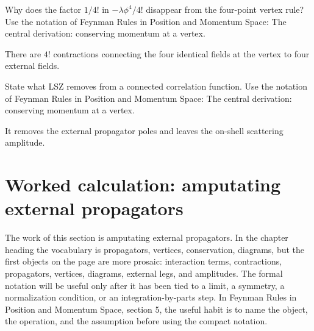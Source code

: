 \begin{exercise}
Why does the factor \(1/4!\) in \(-\lambda\phi^4/4!\) disappear from the four-point vertex rule?  Use the notation of Feynman Rules in Position and Momentum Space: The central derivation: conserving momentum at a vertex.
\begin{answer}
There are \(4!\) contractions connecting the four identical fields at the vertex to four external fields.
\end{answer}
\end{exercise}

\begin{exercise}
State what LSZ removes from a connected correlation function.  Use the notation of Feynman Rules in Position and Momentum Space: The central derivation: conserving momentum at a vertex.
\begin{answer}
It removes the external propagator poles and leaves the on-shell scattering amplitude.
\end{answer}
\end{exercise}



\section{Worked calculation: amputating external propagators}













The work of this section is amputating external propagators.  In the chapter heading the vocabulary is propagators, vertices, conservation, diagrams, but the first objects on the page are more prosaic: interaction terms, contractions, propagators, vertices, diagrams, external legs, and amplitudes.  The formal notation will be useful only after it has been tied to a limit, a symmetry, a normalization condition, or an integration-by-parts step.  In Feynman Rules in Position and Momentum Space, section 5, the useful habit is to name the object, the operation, and the assumption before using the compact notation.

